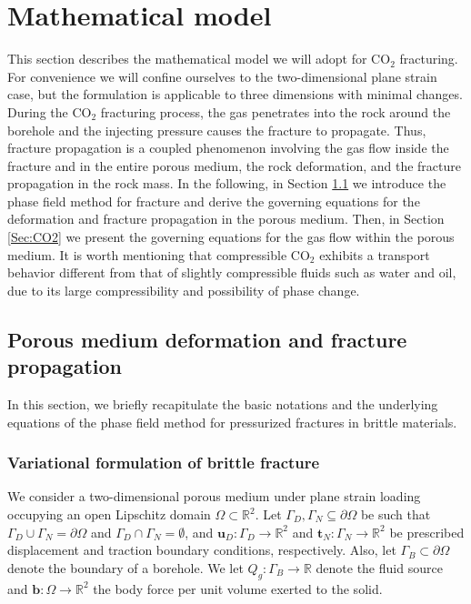 \section{Mathematical model}\label{sec:Math_model}
This section describes the mathematical model we will adopt for CO$_2$ fracturing. For convenience we will confine ourselves to the two-dimensional plane strain case, but the formulation is applicable to three dimensions with minimal changes.
During the CO$_2$ fracturing process, the gas penetrates into the rock around the borehole and the injecting pressure causes the fracture to propagate. Thus, fracture propagation is a coupled phenomenon involving the gas flow inside the fracture and in the entire porous medium, the rock deformation, and the fracture propagation in the rock mass. In the following, in Section \ref{Sec:Phase_Field} we introduce the phase field method for fracture and derive the governing equations for the deformation and fracture propagation in the porous medium. Then, in Section \ref{Sec:CO2} we present the governing equations for the gas flow within the porous medium. It is worth mentioning that compressible CO$_2$ exhibits a transport behavior different from that of slightly compressible fluids such as water and oil, due to its large compressibility and possibility of phase change.
\subsection{Porous medium deformation and fracture propagation}\label{Sec:Phase_Field}
In this section, 
we briefly recapitulate the basic notations and the underlying equations of the phase field method for pressurized fractures in brittle materials.

\subsubsection{Variational formulation of brittle fracture}
We consider a two-dimensional porous medium under plane strain loading occupying an open Lipschitz domain $\Omega\subset\mathbb{R}^2$. 
Let $\Gamma_D,\Gamma_N\subseteq \partial\Omega$ be such that $\Gamma_D\cup\Gamma_N=\partial\Omega$ and $\Gamma_D\cap\Gamma_N=\emptyset$, and $\bm{u}_D: \Gamma_D\rightarrow\mathbb{R}^2$ and $\bm{t}_N: \Gamma_N\rightarrow\mathbb{R}^2$ be prescribed displacement and traction boundary conditions, respectively. Also, let $\Gamma_B\subset \partial \Omega$ denote the boundary of a borehole. We let $Q_g:\Gamma_B\rightarrow\mathbb{R}$ denote the fluid source and $\mathbf{b}:\Omega\rightarrow\mathbb{R}^2$ the body force per unit volume exerted to the solid.

